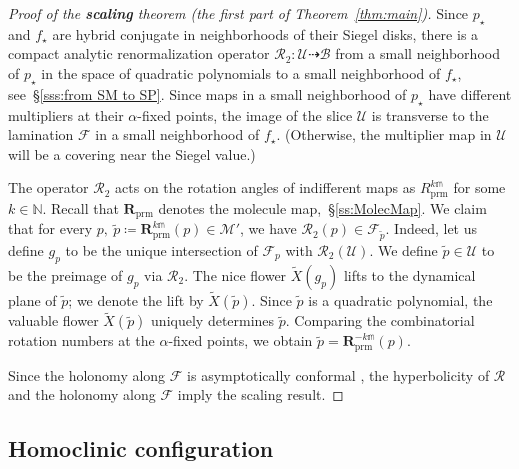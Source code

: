 \documentclass{amsart}
\newcommand{\1}{{\mathbb 1 }}
\newcommand{\Mandel}{{\mathcal{M}}}
\newcommand\RR{\mathcal{R}}
\newcommand\prm{{\operatorname{prm}}}
\newcommand\cRRc{R_{\prm}}%
\newcommand\mRRc{ \boldsymbol R_{\prm}}%
\newcommand{\str}{{\star}}
\newcommand{\mm}{\mathbb{m}}
\newcommand\UU{\mathcal{U}}
\newcommand\BB{\mathcal{B}}
\newcommand{\N}{\mathbb{N}}
\newcommand{\Fol}{{\mathcal F}}
\newcommand{\bFol}{{\boldsymbol{ \mathcal F}}}
\theoremstyle{remark}
\numberwithin{equation}{section}
\theoremstyle{definition}
\theoremstyle{nonumberbreak}
\begin{document}
\begin{proof}[Proof of the {\bf scaling} theorem (the first part of Theorem~\ref{thm:main})]Since $p_\str$ and $f_\str$ are hybrid conjugate in neighborhoods of their Siegel disks, there is a compact analytic renormalization operator $\RR_2\colon\UU\dashrightarrow \BB$ from a small neighborhood of $p_\str$ in the space of quadratic polynomials to a small neighborhood of $f_\str$, see~\S\ref{sss:from SM to SP}. Since maps in a small neighborhood of $p_\str$ have different multipliers at their $\alpha$-fixed points, the image of the slice $\UU$ is transverse to the lamination $\bFol$ in a small neighborhood of $f_\str$. (Otherwise, the multiplier map in $\UU$ will be a covering near the Siegel value.)


The operator $\RR_2$ acts on the rotation angles of indifferent maps as $\cRRc^{k\mm}$ for some $k\in \N$. Recall that $\mRRc$ denotes the molecule map,~\S\ref{ss:MolecMap}. We claim that for every $p,\  \widetilde p\coloneqq \mRRc^{k\mm}( p)\in \Mandel'$, we have $\RR_2( p) \in \bFol_{\widetilde p}$. Indeed, let us define $g_{p}$ to be the unique intersection of $\Fol_{p}$ with $\RR_2(\UU)$. We define $\widetilde p\in \UU$ to be the preimage of $g_p$ via $\RR_2$. The nice flower $\widetilde X(g_p)$ lifts to the dynamical plane of $\widetilde p$; we denote the lift by $\widetilde X(\widetilde p)$. Since $\widetilde p$ is a quadratic polynomial, the valuable flower $\widetilde X(\widetilde p)$ uniquely determines $\widetilde p$. 
 Comparing the combinatorial rotation numbers at the $\alpha$-fixed points, we obtain $\widetilde p = \mRRc^{-k\mm} (p).$
 
 
 Since the holonomy along $\bFol$ is asymptotically conformal \cite[Appendix 2, The $\lambda$-lemma (quasi- conformality)]{L:FCT}, the hyperbolicity of $\RR$ and the holonomy along $\bFol$ imply the scaling result.
\end{proof}


\subsection{Homoclinic configuration}
  \label{ss:HomConf}
\end{document}

